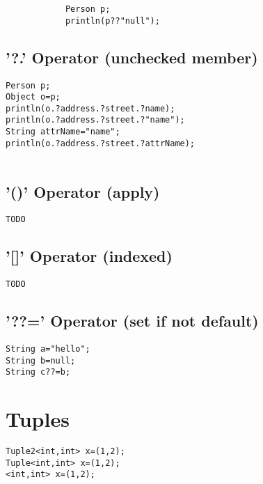 \documentclass{tufte-book}
\begin{document}
            \begin{lstlisting}
            Person p;
            println(p??"null");
            \end{lstlisting}


            \subsection{'?.' Operator (unchecked member)}
            \begin{lstlisting}
Person p;
Object o=p;
println(o.?address.?street.?name);
println(o.?address.?street.?"name");
String attrName="name";
println(o.?address.?street.?attrName);


            \end{lstlisting}

            \subsection{'()' Operator (apply)}
            \begin{lstlisting}
TODO
            \end{lstlisting}

            \subsection{'[]' Operator (indexed)}
            \begin{lstlisting}
TODO
            \end{lstlisting}

            \subsection{'??=' Operator (set if not default)}
            \begin{lstlisting}
String a="hello";
String b=null;
String c??=b;
            \end{lstlisting}

            \section{Tuples}
            \begin{lstlisting}
Tuple2<int,int> x=(1,2);
Tuple<int,int> x=(1,2);
<int,int> x=(1,2);
            \end{lstlisting}
\end{document}
